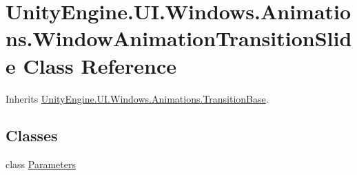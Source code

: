 \hypertarget{class_unity_engine_1_1_u_i_1_1_windows_1_1_animations_1_1_window_animation_transition_slide}{}\section{Unity\+Engine.\+U\+I.\+Windows.\+Animations.\+Window\+Animation\+Transition\+Slide Class Reference}
\label{class_unity_engine_1_1_u_i_1_1_windows_1_1_animations_1_1_window_animation_transition_slide}


Inherits \hyperlink{class_unity_engine_1_1_u_i_1_1_windows_1_1_animations_1_1_transition_base}{Unity\+Engine.\+U\+I.\+Windows.\+Animations.\+Transition\+Base}.

\subsection*{Classes}
\begin{DoxyCompactItemize}
\item 
class \hyperlink{class_unity_engine_1_1_u_i_1_1_windows_1_1_animations_1_1_window_animation_transition_slide_1_1_parameters}{Parameters}
\end{DoxyCompactItemize}
